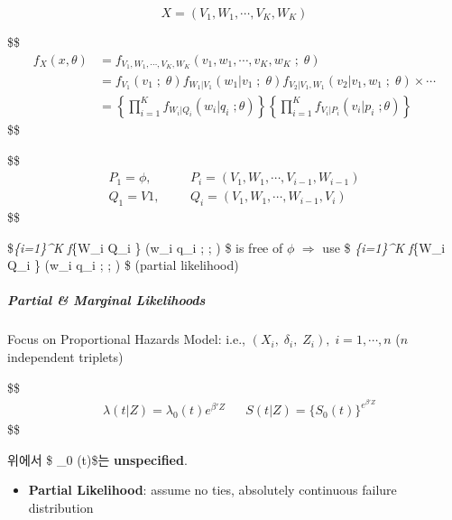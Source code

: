 \documentclass[
]{book}
\providecommand{\tightlist}{%
  \setlength{\itemsep}{0pt}\setlength{\parskip}{0pt}}
\begin{document}
{{{\[
X = (V_1 , W_1 , \cdots, V_K , W_K)
\]

\$\$
\begin{align}


f_X(x, \theta) &= f_{V_1 , W_1 , \cdots, V_K , W_K} (v_1 , w_1 , \cdots, v_K , w_K\; ;\; \theta)
\\

&= 
f_{V_1}(v_1 \; ; \; \theta)

f_{W_1 | V_1}(w_1 | v_1\; ; \; \theta)

f_{V_2 | V_1, W_1}(v_2 |  v_1, w_1\; ; \; \theta) \times \cdots

\\

&= \left \{ \prod_{i=1}^K f_{W_i | Q_i } (w_i \Big | q_i \; ; \theta) \right \}


\left \{ \prod_{i=1}^K f_{V_i | P_i } (v_i \Big | p_i \; ; \theta) \right \}

\end{align}
\$\$

\$\$
\begin{align}


P_1 = \phi,& && P_i =(V_1 , W_1 , \cdots, V_{i-1} , W_{i-1})
\\
Q_1 = V1,& && Q_i =(V_1 , W_1 , \cdots , W_{i-1}, V_i)

\end{align}
\$\$

\$\prod\emph{\{i=1\}\^{}K f}\{W\_i \textbar{} Q\_i \} (w\_i \Big \textbar{} q\_i ; ; \theta) \$ is free of \(\phi\) \(\Rightarrow\) use \$ \prod\emph{\{i=1\}\^{}K f}\{W\_i \textbar{} Q\_i \} (w\_i \Big \textbar{} q\_i ; ; \beta) \$ (partial likelihood)

\hypertarget{partial-marginal-likelihoods}{%
\subparagraph{Partial \& Marginal Likelihoods}\label{partial-marginal-likelihoods}}

Focus on Proportional Hazards Model: i.e., \((X_i, \; \delta_i, \; Z_i), \; i = 1, \cdots, n\) (\(n\) independent triplets)

\$\$
\begin{align}

&\lambda(t \Big | Z ) = \lambda_0 (t) e^{\beta ' Z} &&S(t \Big | Z) = \Big \{ S_0(t) \Big \}^{e^{\beta ' Z}} \tag{1}

\end{align}
\$\$

위에서 \$ \lambda\_0 (t)\$는 \textbf{unspecified}.

\begin{itemize}
\tightlist
\item
  \textbf{Partial Likelihood}: assume no ties, absolutely continuous failure distribution
\end{itemize}

}}}
\end{document}
